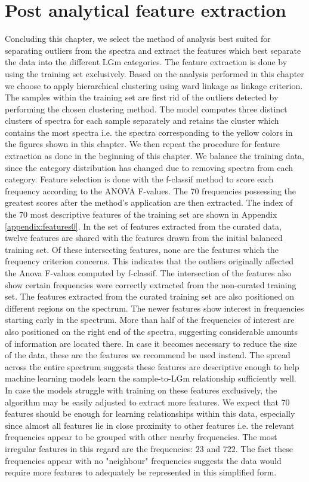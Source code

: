 \section{Post analytical feature extraction}
Concluding this chapter, we select the method of analysis best suited for separating outliers from the spectra and extract the features which best separate the data into the different LGm categories. The feature extraction is done by using the training set exclusively. Based on the analysis performed in this chapter we choose to apply hierarchical clustering using ward linkage as linkage criterion. The samples within the training set are first rid of the outliers detected by performing the chosen clustering method. The model computes three distinct clusters of spectra for each sample separately and retains the cluster which contains the most spectra i.e. the spectra corresponding to the yellow colors in the figures shown in this chapter. We then repeat the procedure for feature extraction as done in the beginning of this chapter. We balance the training data, since the category distribution has changed due to removing spectra from each category. Feature selection is done with the f-classif method to score each frequency according to the ANOVA F-values. The 70 frequencies possessing the greatest scores after the method's application are then extracted. The index of the 70 most descriptive features of the training set are shown in Appendix \ref{appendix:features0}. In the set of features extracted from the curated data, twelve features are shared with the features drawn from the initial balanced training set. Of these intersecting features, none are the features which the frequency criterion concerns. This indicates that the outliers originally affected the Anova F-values computed by f-classif. The intersection of the features also show certain frequencies were correctly extracted from the non-curated training set. The features extracted from the curated training set are also positioned on different regions on the spectrum. The newer features show interest in frequencies starting early in the spectrum. More than half of the frequencies of interest are also positioned on the right end of the spectra, suggesting considerable amounts of information are located there. In case it becomes necessary to reduce the size of the data, these are the features we recommend be used instead. The spread across the entire spectrum suggests these features are descriptive enough to help machine learning models learn the sample-to-LGm relationship sufficiently well. In case the models struggle with training on these features exclusively, the algorithm may be easily adjusted to extract more features. We expect that $70$ features should be enough for learning relationships within this data, especially since almost all features lie in close proximity to other features i.e. the relevant frequencies appear to be grouped with other nearby frequencies. The most irregular features in this regard are the frequencies: $23$ and $722$. The fact these frequencies appear with no "neighbour" frequencies suggests the data would require more features to adequately be represented in this simplified form. 